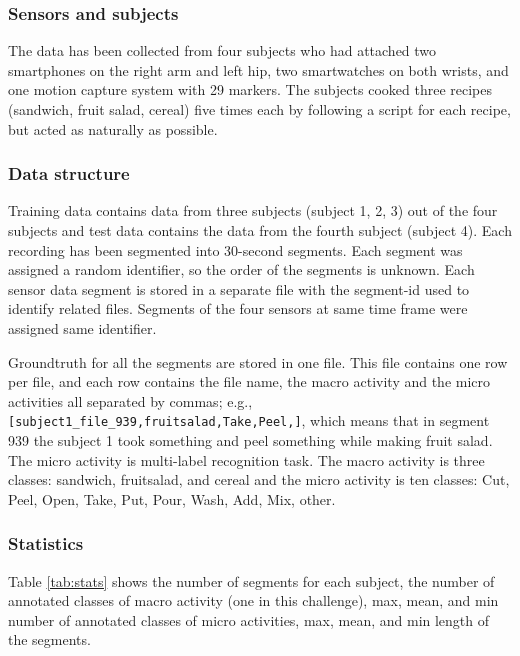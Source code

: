 \documentclass{svmult}
\begin{document}
\subsubsection{Sensors and subjects}
The data has been collected from four subjects who had attached two smartphones on the right arm and left hip, two smartwatches on both wrists, and one motion capture system with 29 markers. The subjects cooked three recipes (sandwich, fruit salad, cereal) five times each by following a script for each recipe, but acted as naturally as possible.

\subsubsection{Data structure}
Training data contains data from three subjects (subject 1, 2, 3) out of the four subjects and test data contains the data from the fourth subject (subject 4).
Each recording has been segmented into 30-second segments. Each segment was assigned a random identifier, so the order of the segments is unknown. Each sensor data segment is stored in a separate file with the segment-id used to identify related files. Segments of the four sensors at same time frame were assigned same identifier. 

Groundtruth for all the segments are stored in one file. This file contains one row per file, and each row contains the file name, the macro activity and the micro activities all separated by commas; e.g., {\tt [subject1\verb|_|file\verb|_|939,fruitsalad,Take,Peel,]}, which means that in segment 939 the subject 1 took something and peel something while making fruit salad. The micro activity is multi-label recognition task.
The macro activity is three classes: sandwich, fruitsalad, and cereal and the micro activity is ten classes: Cut, Peel, Open, Take, Put, Pour, Wash, Add, Mix, other.

\subsubsection{Statistics}
Table \ref{tab:stats} shows the number of segments for each subject, the number of annotated classes of macro activity (one in this challenge), max, mean, and min number of annotated classes of micro activities, max, mean, and min length of the segments.
\end{document}
